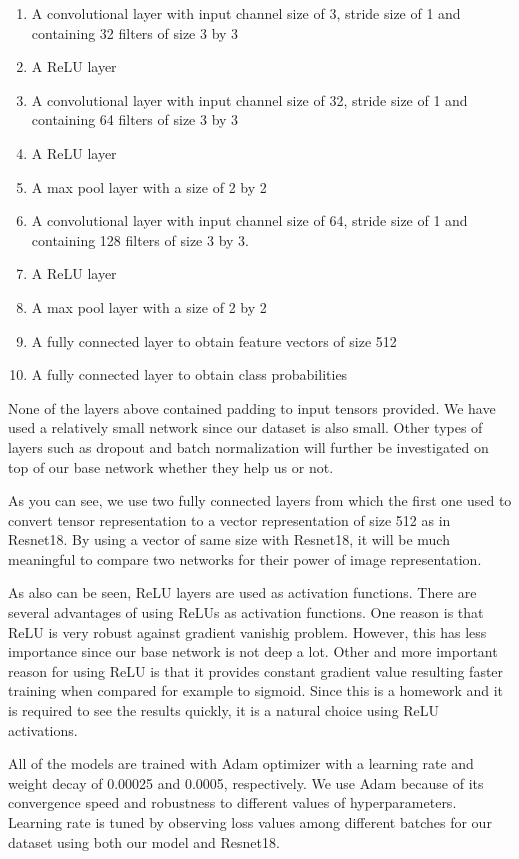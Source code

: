 \documentclass{article}
\begin{document}
  \begin{enumerate}
    \item A convolutional layer with input channel size of 3, stride size of 1 and containing 32 filters of size 3 by 3
    \item A ReLU layer
    \item A convolutional layer with input channel size of 32, stride size of 1 and containing 64 filters of size 3 by 3
    \item A ReLU layer
    \item A max pool layer with a size of 2 by 2
    \item A convolutional layer with input channel size of 64, stride size of 1 and containing 128 filters of size 3 by 3.
    \item A ReLU layer
    \item A max pool layer with a size of 2 by 2
    \item A fully connected layer to obtain feature vectors of size 512
    \item A fully connected layer to obtain class probabilities
  \end{enumerate}%
  
None of the layers above contained padding to input tensors provided. We have used a relatively small network since our dataset is also small. Other types of layers such as dropout and batch normalization will further be investigated on top of our base network whether they help us or not.

As you can see, we use two fully connected layers from which the first one used to convert tensor representation to a vector representation of size 512 as in Resnet18. By using a vector of same size with Resnet18, it will be much meaningful to compare two networks for their power of image representation.

As also can be seen, ReLU layers are used as activation functions. There are several advantages of using ReLUs as activation functions. One reason is that ReLU is very robust against gradient vanishig problem. However, this has less importance since our base network is not deep a lot. Other and more important reason for using ReLU is that it provides constant gradient value resulting faster training when compared for example to sigmoid. Since this is a homework and it is required to see the results quickly, it is a natural choice using ReLU activations.

All of the models are trained with Adam optimizer with a learning rate and weight decay of 0.00025 and 0.0005, respectively. We use Adam because of its convergence speed and robustness to different values of hyperparameters. Learning rate is tuned by observing loss values among different batches for our dataset using both our model and Resnet18.
\end{document}

